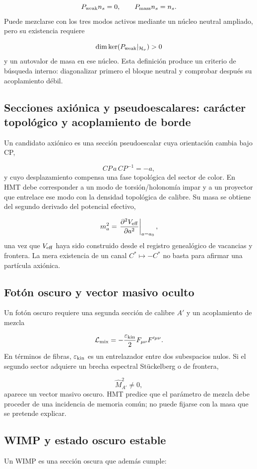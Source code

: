 \[
 P_{\rm weak}n_s=0,\qquad
 P_{\rm mass}n_s=n_s.
\]
Puede mezclarse con los tres modos activos mediante un núcleo neutral ampliado, pero su existencia requiere

\[
 \dim\ker(P_{\rm weak}|_{\mathcal H_\nu})>0
\]
y un autovalor de masa en ese núcleo. Esta definición produce un criterio de búsqueda interno: diagonalizar primero el bloque neutral y comprobar después su acoplamiento débil.

\subsection{Secciones axiónica y pseudoescalares: carácter topológico y acoplamiento de borde}
Un candidato axiónico es una sección pseudoescalar cuya orientación cambia bajo CP,

\[
 CP\,a\,CP^{-1}=-a,
\]
y cuyo desplazamiento compensa una fase topológica del sector de color. En HMT debe corresponder a un modo de torsión/holonomía impar y a un proyector que entrelace ese modo con la densidad topológica de calibre. Su masa se obtiene del segundo derivado del potencial efectivo,

\[
 m_a^2=
 \left.\frac{\partial^2V_{\rm eff}}{\partial a^2}\right|_{a=a_0},
\]
una vez que \(V_{\rm eff}\) haya sido construido desde el registro genealógico de vacancias y frontera. La mera existencia de un canal \(C^*\mapsto-C^*\) no basta para afirmar una partícula axiónica.

\subsection{Fotón oscuro y vector masivo oculto}
Un fotón oscuro requiere una segunda sección de calibre \(A'\) y un acoplamiento de mezcla

\[
 \mathcal L_{\rm mix}
 =-\frac{\varepsilon_{\rm kin}}2F_{\mu\nu}F'^{\mu\nu}.
\]
En términos de fibras, \(\varepsilon_{\rm kin}\) es un entrelazador entre dos subespacios nulos. Si el segundo sector adquiere un brecha espectral Stückelberg o de frontera,

\[
 \widehat M_{A'}^2\ne0,
\]
aparece un vector masivo oscuro. HMT predice que el parámetro de mezcla debe proceder de una incidencia de memoria común; no puede fijarse con la masa que se pretende explicar.

\subsection{WIMP y estado oscuro estable}
Un WIMP es una sección oscura que además cumple:

